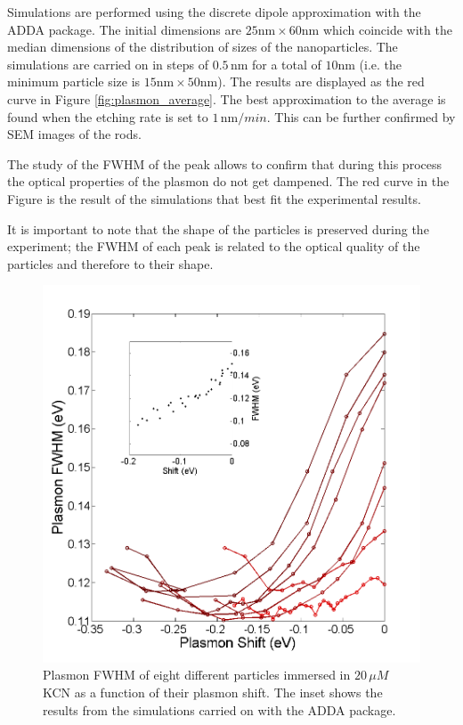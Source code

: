 \documentclass{article}
\begin{document}
Simulations are performed using the discrete dipole approximation with the ADDA
package\cite{Yurkin2011}. The initial dimensions are
$25\textrm{nm}\times60\textrm{nm}$ which coincide with the median dimensions of
the distribution of sizes of the nanoparticles. The simulations are carried on
in steps of $0.5\,\textrm{nm}$ for a total of $10\textrm{nm}$ (i.e. the minimum
particle size is $15\textrm{nm}\times 50 \textrm{nm}$). The results are
displayed as the red curve in Figure \ref{fig:plasmon_average}. The best
approximation to the average is found when the etching rate is set to
$1\,\textrm{nm}/min$. This can be further confirmed by SEM images of the rods.

The study of the FWHM of the peak allows to confirm that during this process the
optical properties of the plasmon do not get dampened.
The red curve in the Figure is the result of the simulations that best fit the
experimental results.

It is important to note that the shape of the particles is
preserved during the experiment; the FWHM of each peak is related to the optical
quality of the particles and therefore to their shape.

\begin{figure}[p]
 \centering
 \includegraphics[width=0.95\linewidth]{fwhm_several_in_eV.png}
 \caption{Plasmon FWHM of eight different particles immersed in $20\,\mu M$ KCN
 as a function of their plasmon shift. The inset shows the results from the
 simulations carried on with the ADDA package.}
 \label{fig:FWHM}
\end{figure}
\end{document}
